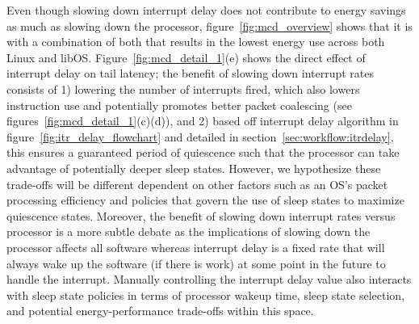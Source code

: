 Even though slowing down interrupt delay does not contribute to energy savings as much as slowing down the processor, figure~\ref{fig:mcd_overview} shows that it is  with a combination of both that results in the lowest energy use across both Linux and libOS. Figure~\ref{fig:mcd_detail_1}(e) shows the direct effect of interrupt delay on tail latency; the benefit of slowing down interrupt rates consists of 1) lowering the number of interrupts fired, which also lowers instruction use and potentially promotes better packet coalescing (see figures~\ref{fig:mcd_detail_1}(c)(d)), and 2) based off interrupt delay algorithm in figure~\ref{fig:itr_delay_flowchart} and detailed in section~\ref{sec:workflow:itrdelay}, this ensures a guaranteed period of quiescence such that the processor can take advantage of potentially deeper sleep states. However, we hypothesize these trade-offs will be different dependent on other factors such as an OS's packet processing efficiency and policies that govern the use of sleep states to maximize quiescence states. Moreover, the benefit of slowing down interrupt rates versus processor is a more subtle debate as the implications of slowing down the processor affects all software whereas interrupt delay is a fixed rate that will always wake up the software (if there is work) at some point in the future to handle the interrupt. Manually controlling the interrupt delay value also interacts with sleep state policies in terms of processor wakeup time, sleep state selection, and potential energy-performance trade-offs within this space. 

